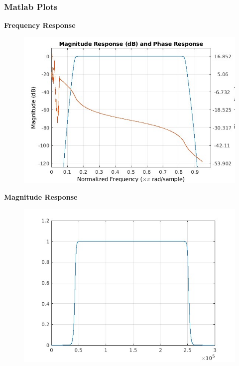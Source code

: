 \documentclass{article}
\begin{document}
\subsubsection{Matlab Plots}
\textbf{Frequency Response}
\begin{figure}[H]
\hspace*{-2.5cm}
    \centering
    \includegraphics[scale = 0.7]{Freq_resp_bpf.jpg}
    \label{fig:my_label}
\end{figure}

\textbf{Magnitude Response}
\begin{figure}[H]
\hspace*{-2.5cm}
    \centering
    \includegraphics[scale = 0.6]{mag_Resp_bpf.jpg}
    \label{fig:my_label}
\end{figure}
\end{document}
